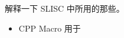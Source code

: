 
\begin{issues}
\issueDraft
\end{issues}

解释一下 SLISC 中所用的那些。

\begin{itemize}
\item CPP Macro 用于
\end{itemize}
